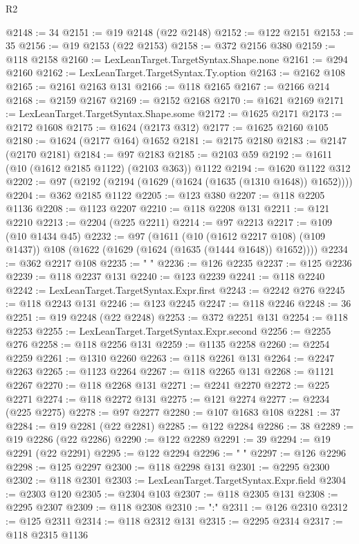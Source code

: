 \begin{lexlean}{R2}
\begin{coremodule}
@2148 := 34
@2151 := @19 @2148 (@22 @2148)
@2152 := @122 @2151
@2153 := 35
@2156 := @19 @2153 (@22 @2153)
@2158 := @372 @2156 @380
@2159 := @118 @2158
@2160 := LexLeanTarget.TargetSyntax.Shape.none
@2161 := @294 @2160
@2162 := LexLeanTarget.TargetSyntax.Ty.option
@2163 := @2162 @108
@2165 := @2161 @2163 @131
@2166 := @118 @2165
@2167 := @2166 @214
@2168 := @2159 @2167
@2169 := @2152 @2168
@2170 := @1621 @2169
@2171 := LexLeanTarget.TargetSyntax.Shape.some
@2172 := @1625 @2171
@2173 := @2172 @1608
@2175 := @1624 (@2173 @312)
@2177 := @1625 @2160 @105
@2180 := @1624 (@2177 @164) @1652
@2181 := @2175 @2180
@2183 := @2147 (@2170 @2181)
@2184 := @97 @2183
@2185 := @2103 @59
@2192 := @1611 (@10 (@1612 @2185 @1122) (@2103 @363)) @1122
@2194 := @1620 @1122 @312
@2202 := @97 (@2192 (@2194 (@1629 (@1624 (@1635 (@1310 @1648)) @1652))))
@2204 := @362 @2185 @1122
@2205 := @123 @380
@2207 := @118 @2205 @1136
@2208 := @1123 @2207
@2210 := @118 @2208 @131
@2211 := @121 @2210
@2213 := @2204 (@225 @2211)
@2214 := @97 @2213
@2217 := @109 (@10 @1434 @45)
@2232 := @97
    (@1611
      (@10 (@1612 @2217 @108) (@109 @1437))
      @108
      (@1622 (@1629 (@1624 (@1635 (@1444 @1648)) @1652))))
@2234 := @362 @2217 @108
@2235 := "            "
@2236 := @126 @2235
@2237 := @125 @2236
@2239 := @118 @2237 @131
@2240 := @123 @2239
@2241 := @118 @2240
@2242 := LexLeanTarget.TargetSyntax.Expr.first
@2243 := @2242 @276
@2245 := @118 @2243 @131
@2246 := @123 @2245
@2247 := @118 @2246
@2248 := 36
@2251 := @19 @2248 (@22 @2248)
@2253 := @372 @2251 @131
@2254 := @118 @2253
@2255 := LexLeanTarget.TargetSyntax.Expr.second
@2256 := @2255 @276
@2258 := @118 @2256 @131
@2259 := @1135 @2258
@2260 := @2254 @2259
@2261 := @1310 @2260
@2263 := @118 @2261 @131
@2264 := @2247 @2263
@2265 := @1123 @2264
@2267 := @118 @2265 @131
@2268 := @1121 @2267
@2270 := @118 @2268 @131
@2271 := @2241 @2270
@2272 := @225 @2271
@2274 := @118 @2272 @131
@2275 := @121 @2274
@2277 := @2234 (@225 @2275)
@2278 := @97 @2277
@2280 := @107 @1683 @108
@2281 := 37
@2284 := @19 @2281 (@22 @2281)
@2285 := @122 @2284
@2286 := 38
@2289 := @19 @2286 (@22 @2286)
@2290 := @122 @2289
@2291 := 39
@2294 := @19 @2291 (@22 @2291)
@2295 := @122 @2294
@2296 := "  "
@2297 := @126 @2296
@2298 := @125 @2297
@2300 := @118 @2298 @131
@2301 := @2295 @2300
@2302 := @118 @2301
@2303 := LexLeanTarget.TargetSyntax.Expr.field
@2304 := @2303 @120
@2305 := @2304 @103
@2307 := @118 @2305 @131
@2308 := @2295 @2307
@2309 := @118 @2308
@2310 := ":"
@2311 := @126 @2310
@2312 := @125 @2311
@2314 := @118 @2312 @131
@2315 := @2295 @2314
@2317 := @118 @2315 @1136

\end{coremodule}
\end{lexlean}
